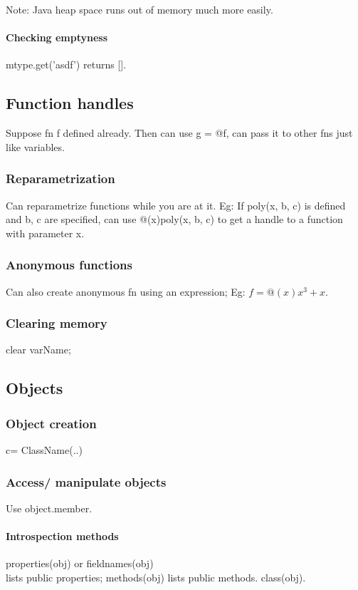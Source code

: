 \documentclass[oneside, article]{memoir}
\begin{document}
Note: Java heap space runs out of memory much more easily.

\paragraph*{Checking emptyness}
mtype.get('asdf') returns [].

\subsection{Function handles}
Suppose fn f defined already. Then can use g = @f, can pass it to other fns just like variables.

\subsubsection{Reparametrization}
Can reparametrize functions while you are at it. Eg: If poly(x, b, c) is defined and b, c are specified, can use @(x)poly(x, b, c) to get a handle to a function with parameter x.

\subsubsection{Anonymous functions}
Can also create anonymous fn using an expression; Eg: $f = @(x)x^3+x$.

\subsubsection{Clearing memory}
clear varName;

\subsection{Objects}
\subsubsection{Object creation}
c= ClassName(..)

\subsubsection{Access/ manipulate objects}
Use object.member.

\paragraph*{Introspection methods}
properties(obj) or fieldnames(obj) \\
lists public properties; methods(obj) lists public methods. class(obj).
\end{document}
